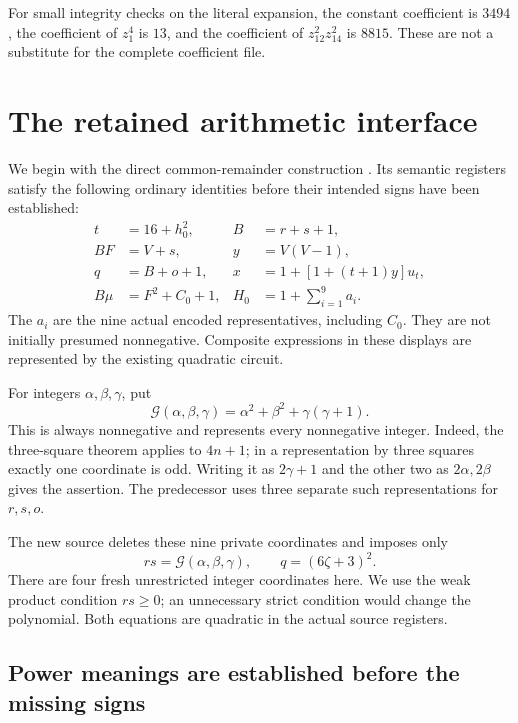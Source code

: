 \documentclass[11pt,letterpaper]{article}
\newcommand{\G}{\mathcal G}
\begin{document}
For small integrity checks on the literal expansion, the constant
coefficient is $3494$, the coefficient of $z_1^4$ is $13$, and the
coefficient of $z_{12}^2z_{14}^2$ is $8815$. These are not a substitute
for the complete coefficient file.

\section{The retained arithmetic interface}
\label{sec:interface}

We begin with the direct common-remainder construction \cite{common}.
Its semantic registers satisfy the following ordinary identities before
their intended signs have been established:
\begin{align}
 t&=16+h_0^2,                  & B&=r+s+1,                    \label{eq:fronta}\\
 BF&=V+s,                     & y&=V(V-1),                   \label{eq:frontb}\\
 q&=B+o+1,                    & x&=1+[1+(t+1)y]u_t,           \label{eq:frontc}\\
 B\mu&=F^2+C_0+1,             & H_0&=1+\sum_{i=1}^{9}a_i.    \label{eq:frontd}
\end{align}
The $a_i$ are the nine actual encoded representatives, including $C_0$.
They are not initially presumed nonnegative. Composite expressions in
these displays are represented by the existing quadratic circuit.

For integers $\alpha,\beta,\gamma$, put
\[
 \G(\alpha,\beta,\gamma)=\alpha^2+\beta^2+\gamma(\gamma+1).
\]
This is always nonnegative and represents every nonnegative integer.
Indeed, the three-square theorem applies to $4n+1$; in a representation
by three squares exactly one coordinate is odd. Writing it as
$2\gamma+1$ and the other two as $2\alpha,2\beta$ gives the assertion.
The predecessor uses three separate such representations for $r,s,o$.

The new source deletes these nine private coordinates and imposes only
\begin{equation}\label{eq:new}
 \boxed{\quad
 rs=\G(\alpha,\beta,\gamma),\qquad q=(6\zeta+3)^2.
 \quad}
\end{equation}
There are four fresh unrestricted integer coordinates here. We use
the weak product condition $rs\ge0$; an unnecessary strict condition
would change the polynomial. Both equations are quadratic in the
actual source registers.

\subsection{Power meanings are established before the missing signs}
\end{document}
